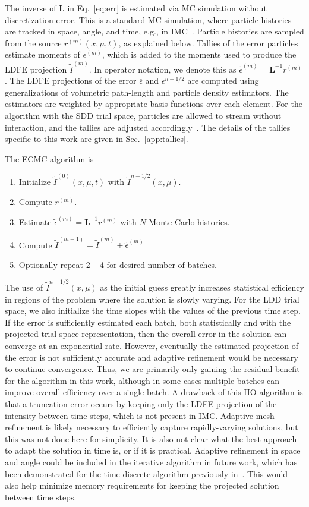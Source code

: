 \documentclass{anstrans}
\newcommand{\B}[1]{\ensuremath{\mathbf{#1}}}
\begin{document}
The inverse of $\B L$ in Eq.~\eqref{eq:err} is estimated via MC simulation without discretization
error.  This is a standard MC simulation, where particle histories are tracked in space, angle, and
time, e.g., in IMC~\cite{fnc,wollaber_review,dissertation}.
Particle histories are sampled from the source $r^{(m)}(x,\mu,t)$, as explained below.
 Tallies of the error particles estimate 
moments of $\epsilon^{(m)}$, which is added to the moments used to produce the LDFE projection
$\tilde{I}^{(m)}$. In operator notation, we denote this as $\tilde{\epsilon}^{(m)} = \B L^{-1}
r^{(m)}$.    The LDFE projections of the
error $\overline{\epsilon}$ and $\epsilon^{n+1/2}$ are computed using generalizations of volumetric
path-length and particle density estimators. The estimators are weighted by appropriate basis
functions over each element.  For the algorithm with the SDD trial space, particles are allowed to stream without
interaction, and the tallies are adjusted accordingly~\cite{bolding_nse}.  
The details of the tallies specific to this work are given in Sec.~\ref{app:tallies}.

  The ECMC algorithm is
\begin{enumerate}
    \item Initialize $\tilde I^{(0)}(x,\mu,t)$ with $\tilde I^{n-1/2}(x,\mu)$.
\item Compute $r^{(m)}$.
\item Estimate $\tilde{\epsilon}^{(m)} = \B L^{-1} r^{(m)}$ with $N$ Monte Carlo histories.
\item Compute $\tilde I^{(m+1)} = \tilde I^{(m)}
+ \tilde\epsilon^{(m)}$
\item Optionally repeat 2 -- 4 for desired number of batches.
\end{enumerate}

The use of $\tilde I^{n-1/2}(x,\mu)$ as the initial guess greatly increases statistical efficiency
in regions of the problem where the solution is slowly varying.  For the LDD trial space, we also
initialize the time slopes with the values of the previous time step. If the error is sufficiently
estimated each batch, both statistically and with the projected trial-space representation, then the overall 
error in the solution can converge at an exponential rate.  However, eventually the estimated projection of
the error is not sufficiently accurate  and adaptive refinement would be necessary to continue convergence.  Thus, we are
primarily only gaining the residual benefit for the algorithm in this work, although in some cases multiple
batches can improve overall efficiency over a single batch.  A drawback of this HO algorithm is that
a truncation error occurs by keeping only the LDFE projection of the intensity between
time steps, which is not present in IMC.  Adaptive mesh refinement is likely necessary to
efficiently capture rapidly-varying solutions, but this was not done here for simplicity.  
It is also not clear what the best approach to adapt the solution in time is, or if it is practical.   
Adaptive refinement in space and angle could be included in the iterative algorithm in future work, which has been
demonstrated for the time-discrete algorithm previously in~\cite{bolding_nse}.  This would also help
minimize memory requirements for keeping the projected solution between time steps.
\end{document}
